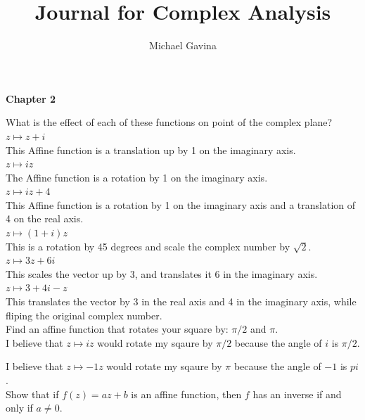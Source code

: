 \documentclass[12pt]{article}
\title{Journal for Complex Analysis}
\author{Michael Gavina}
\begin{document}
\maketitle


\textbf{\large Chapter 2}


 What is the effect of each of these functions on point of the complex plane?\\


 $z \mapsto z + i$\\
This Affine function is a translation up by 1 on the imaginary axis.\\


 $z \mapsto iz$\\
The Affine function is a rotation by 1 on the imaginary axis.\\


 $z \mapsto iz + 4$\\
This Affine function is a rotation by 1 on the imaginary axis and a translation of 4 on the real axis.\\


 $z \mapsto (1 + i)z$\\
This is a rotation by 45 degrees and scale the complex number by $\sqrt{2}$.\\


 $z \mapsto 3z + 6i$\\
This scales the vector up by 3, and translates it 6 in the imaginary axis.\\


 $z \mapsto 3 + 4i - z$\\
This translates the vector by 3 in the real axis and 4 in the imaginary axis, while fliping the original complex number.\\


 Find an affine function that rotates your square by: $\pi/2$ and $\pi$.\\
I believe that $z \mapsto iz$ would rotate my sqaure by $\pi/2$ because the angle of $i$ is $\pi/2$.

I believe that $z \mapsto -1z$ would rotate my sqaure by $\pi$ because the angle of $-1$ is $pi$.\\


 Show that if $f(z) = az + b$ is an affine function, then $f$ has an inverse if and only if $a \neq 0$.\\ 
\end{document}
